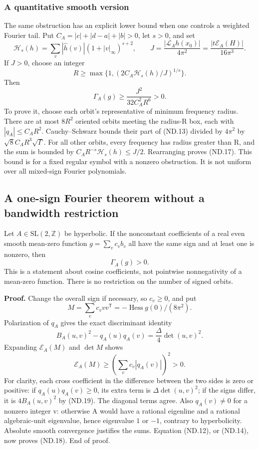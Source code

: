 \subsubsection{A quantitative smooth version}\label{nondegeneracy:a-quantitative-smooth-version}

The same obstruction has an explicit lower bound when one controls a weighted Fourier tail. Put \(C_A=|c|+|d-a|+|b|>0\), let \(s>0\), and set \[
 \mathcal H_s(h)=\sum_v|\widehat h(v)|(1+|v|_\infty)^{s+2},
 \qquad
 J=\frac{|\mathcal L_Ah(x_0)|}{4\pi^2}
   =\frac{|t\mathcal E_A(H)|}{16\pi^3}.
\] If \(J>0\), choose an integer \[
 R\geq\max\{1,(2C_A\mathcal H_s(h)/J)^{1/s}\}.
\] Then \[
                  \Gamma_A(g)\geq\frac{J^2}{32C_A^2R^6}>0. \tag{ND.17}
\] To prove it, choose each orbit's representative of minimum frequency radius. There are at most \(8R^2\) oriented orbits meeting the radius-R box, each with \(|q_A|\leq C_AR^2\). Cauchy--Schwarz bounds their part of (ND.13) divided by \(4\pi^2\) by \(\sqrt8 C_AR^3\sqrt\Gamma\). For all other orbits, every frequency has radius greater than R, and the sum is bounded by \(C_AR^{-s}\mathcal H_s(h)\leq J/2\). Rearranging proves (ND.17). This bound is for a fixed regular symbol with a nonzero obstruction. It is not uniform over all mixed-sign Fourier polynomials.

\subsection{A one-sign Fourier theorem without a bandwidth restriction}\label{nondegeneracy:a-one-sign-fourier-theorem-without-a-bandwidth-restriction}

\begin{theorem}\label{pass1:ch10_resonance_rigidity-3} Let \(A\in\mathrm{SL}(2,\mathbb Z)\) be hyperbolic. If the nonconstant coefficients of a real even smooth mean-zero function \(g=\sum_v c_vb_v\) all have the same sign and at least one is nonzero, then \[
                             \Gamma_A(g)>0.                 \tag{ND.18}
\] This is a statement about cosine coefficients, not pointwise nonnegativity of a mean-zero function. There is no restriction on the number of signed orbits.
\end{theorem}

\textbf{Proof.} Change the overall sign if necessary, so \(c_v\geq0\), and put \[
 M=\sum_v c_vvv^{\mathsf T}=-\operatorname{Hess}g(0)/(8\pi^2).
\] Polarization of \(q_A\) gives the exact discriminant identity \[
 B_A(u,v)^2-q_A(u)q_A(v)=\frac\Delta4\det(u,v)^2.            \tag{ND.19}
\] Expanding \(\mathcal E_A(M)\) and \(\det M\) shows \[
       \mathcal E_A(M)\geq\left(\sum_v c_v|q_A(v)|\right)^2>0.
 \tag{ND.20}
\] For clarity, each cross coefficient in the difference between the two sides is zero or positive: if \(q_A(u)q_A(v)\geq0\), its extra term is \(\Delta\det(u,v)^2\); if the signs differ, it is \(4B_A(u,v)^2\) by (ND.19). The diagonal terms agree. Also \(q_A(v)\ne0\) for a nonzero integer v: otherwise A would have a rational eigenline and a rational algebraic-unit eigenvalue, hence eigenvalue \(1\) or \(-1\), contrary to hyperbolicity. Absolute smooth convergence justifies the sums. Equation (ND.12), or (ND.14), now proves (ND.18). End of proof.

